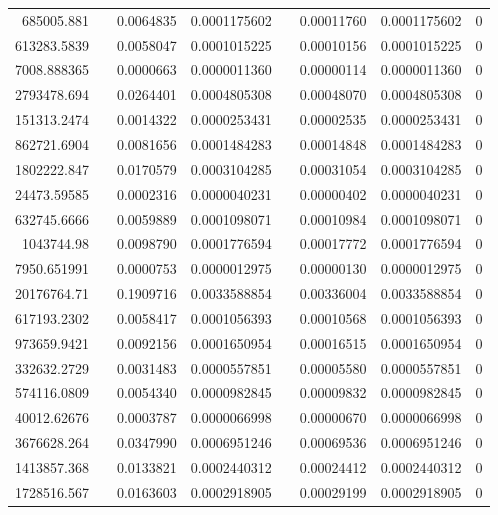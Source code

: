\documentclass[
journal=jacsat, %
manuscript=article]{achemso}
\begin{document}
\begin{table}[htbp]
{\begin{tabular}{rrrrrrrr}
    685005.881 &       & 0.0064835 & 0.0001175602 &       & 0.00011760 & 0.0001175602 & 0 \\
    613283.5839 &       & 0.0058047 & 0.0001015225 &       & 0.00010156 & 0.0001015225 & 0 \\
    7008.888365 &       & 0.0000663 & 0.0000011360 &       & 0.00000114 & 0.0000011360 & 0 \\
    2793478.694 &       & 0.0264401 & 0.0004805308 &       & 0.00048070 & 0.0004805308 & 0 \\
    151313.2474 &       & 0.0014322 & 0.0000253431 &       & 0.00002535 & 0.0000253431 & 0 \\
    862721.6904 &       & 0.0081656 & 0.0001484283 &       & 0.00014848 & 0.0001484283 & 0 \\
    1802222.847 &       & 0.0170579 & 0.0003104285 &       & 0.00031054 & 0.0003104285 & 0 \\
    24473.59585 &       & 0.0002316 & 0.0000040231 &       & 0.00000402 & 0.0000040231 & 0 \\
    632745.6666 &       & 0.0059889 & 0.0001098071 &       & 0.00010984 & 0.0001098071 & 0 \\
    1043744.98 &       & 0.0098790 & 0.0001776594 &       & 0.00017772 & 0.0001776594 & 0 \\
    7950.651991 &       & 0.0000753 & 0.0000012975 &       & 0.00000130 & 0.0000012975 & 0 \\
    20176764.71 &       & 0.1909716 & 0.0033588854 &       & 0.00336004 & 0.0033588854 & 0 \\
    617193.2302 &       & 0.0058417 & 0.0001056393 &       & 0.00010568 & 0.0001056393 & 0 \\
    973659.9421 &       & 0.0092156 & 0.0001650954 &       & 0.00016515 & 0.0001650954 & 0 \\
    332632.2729 &       & 0.0031483 & 0.0000557851 &       & 0.00005580 & 0.0000557851 & 0 \\
    574116.0809 &       & 0.0054340 & 0.0000982845 &       & 0.00009832 & 0.0000982845 & 0 \\
    40012.62676 &       & 0.0003787 & 0.0000066998 &       & 0.00000670 & 0.0000066998 & 0 \\
    3676628.264 &       & 0.0347990 & 0.0006951246 &       & 0.00069536 & 0.0006951246 & 0 \\
    1413857.368 &       & 0.0133821 & 0.0002440312 &       & 0.00024412 & 0.0002440312 & 0 \\
    1728516.567 &       & 0.0163603 & 0.0002918905 &       & 0.00029199 & 0.0002918905 & 0 \\

\end{tabular}}
\end{table}
\end{document}
